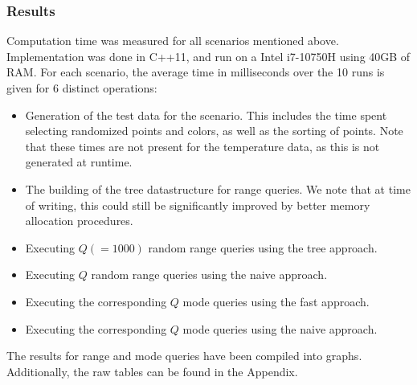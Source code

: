 \documentclass{article}
\begin{document}
\subsubsection*{Results}
Computation time was measured for all scenarios mentioned above. Implementation was done in C++11, and run on a Intel i7-10750H using 40GB of RAM. For each scenario, the average time in milliseconds over the 10 runs is given for 6 distinct operations: 
\begin{itemize}
    \item Generation of the test data for the scenario. This includes the time spent selecting randomized points and colors, as well as the sorting of points. Note that these times are not present for the temperature data, as this is not generated at runtime. 
    \item The building of the tree datastructure for range queries. We note that at time of writing, this could still be significantly improved by better memory allocation procedures. 
    \item Executing $Q (= 1000)$ random range queries using the tree approach. 
    \item Executing $Q$ random range queries using the naive approach. 
    \item Executing the corresponding $Q$ mode queries using the fast approach. 
    \item Executing the corresponding $Q$ mode queries using the naive approach. 
\end{itemize}
The results for range and mode queries have been compiled into graphs. Additionally, the raw tables can be found in the Appendix.\\


\end{document}
